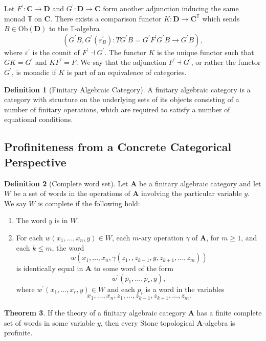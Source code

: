 \documentclass[reqno,dvipsnames]{amsart}
\let\bg\boldsymbol
\newcommand{\p}{\prime}
\newcommand{\T}{\mathbb{T}}
\renewcommand{\epsilon}{\varepsilon}
\newcommand{\e}{\epsilon}
\newcommand{\Ob}{\text{Ob}}
\theoremstyle{definition}
\newtheorem{theorem}{Theorem}[section]
\newtheorem{definition}[theorem]{Definition}
\begin{document}
{Let $F^\p:\bg{C}\to\bg{D}$ and $G^\p:\bg{D}\to\bg{C}$ form another adjunction inducing the same monad $\T$ on $\bg{C}$. There exists a comparison functor $K:\bg{D}\to\bg{C}^{\T}$ which sends $B\in\Ob(\bg{D})$ to the $\T$-algebra
\[(G^\p B,G^\p(\e^\p_B):TG^\p B=G^\p F^\p G^\p B\to G^\p B),\]
where $\e^\p$ is the counit of $F^\p\dashv G^\p$. The functor $K$ is the unique functor such that $GK=G^\p$ and $KF^\p=F$. We say that the adjunction $F^\p\dashv G^\p$, or rather the functor $G^\p$, is monadic if $K$ is part of an equivalence of categories.

\begin{definition}[Finitary Algebraic Category]
A finitary algebraic category is a category with structure on the underlying sets of its objects consisting of a number of finitary operations, which are required to satisfy a number of equational conditions.
\end{definition}

\subsection{Profiniteness from a Concrete Categorical Perspective}

\begin{definition}[Complete word set]
Let $\bg{A}$ be a finitary algebraic category and let $W$ be a set of words in the operations of $\bg{A}$ involving the particular variable $y$. We say $W$ is complete if the following hold:
\begin{enumerate}[label=(\roman*)]
    \item The word $y$ is in $W$.
    \item For each $w(x_1,\dots,x_n,y)\in W$, each $m$-ary operation $\gamma$ of $\bg{A}$, for $m\geq1$, and each $k\leq m$, the word
    \[w(x_1,\dots,x_n,\gamma(z_1,\dot,z_{k-1},y,z_{k+1},\dots,z_m))\]
    is identically equal in $\bg{A}$ to some word of the form
    \[w^\p(p_1,\dots,p_r,y),\]
    where $w^\p(x_1,\dots,x_r,y)\in W$ and each $p_i$ is a word in the variables
    \[x_1,\dots,x_n,z_1,\dots,z_{k-1},z_{k+1},\dots,z_m.\]
\end{enumerate}
\end{definition}

\begin{theorem}
If the theory of a finitary algebraic category $\bg{A}$ has a finite complete set of words in some variable $y$, then every Stone topological $\bg{A}$-algebra is profinite.
\end{theorem}

}
\end{document}
